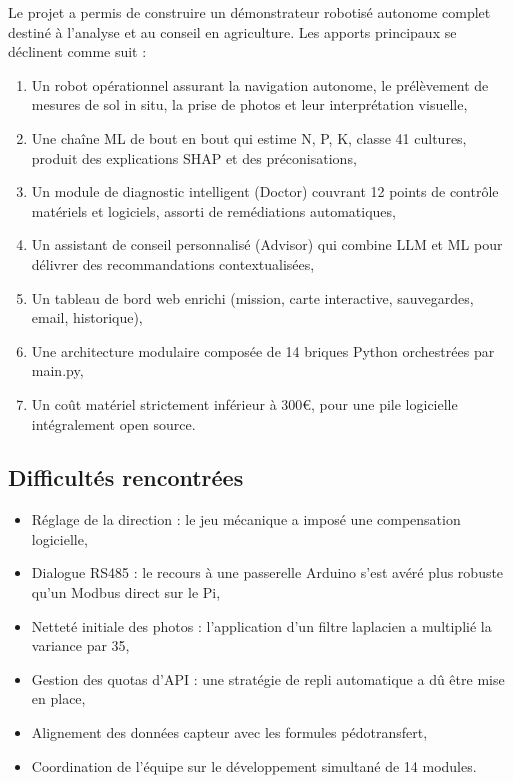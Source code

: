 \documentclass[a4paper,12pt,openany,titlepage]{scrartcl}
\begin{document}
Le projet a permis de construire un démonstrateur robotisé autonome complet destiné à l’analyse et au conseil en agriculture. Les apports principaux se déclinent comme suit :

\begin{enumerate}[nosep]
    \item Un robot opérationnel assurant la navigation autonome, le prélèvement de mesures de sol in situ, la prise de photos et leur interprétation visuelle,
    \item Une chaîne ML de bout en bout qui estime N, P, K, classe 41 cultures, produit des explications SHAP et des préconisations,
    \item Un module de diagnostic intelligent (Doctor) couvrant 12 points de contrôle matériels et logiciels, assorti de remédiations automatiques,
    \item Un assistant de conseil personnalisé (Advisor) qui combine LLM et ML pour délivrer des recommandations contextualisées,
    \item Un tableau de bord web enrichi (mission, carte interactive, sauvegardes, email, historique),
    \item Une architecture modulaire composée de 14 briques Python orchestrées par main.py,
    \item Un coût matériel strictement inférieur à 300\euro, pour une pile logicielle intégralement open source.
\end{enumerate}

\subsection{Difficultés rencontrées}
\begin{itemize}[nosep]
    \item Réglage de la direction : le jeu mécanique a imposé une compensation logicielle,
    \item Dialogue RS485 : le recours à une passerelle Arduino s’est avéré plus robuste qu’un Modbus direct sur le Pi,
    \item Netteté initiale des photos : l’application d’un filtre laplacien a multiplié la variance par 35,
    \item Gestion des quotas d’API : une stratégie de repli automatique a dû être mise en place,
    \item Alignement des données capteur avec les formules pédotransfert,
    \item Coordination de l’équipe sur le développement simultané de 14 modules.
\end{itemize}
\end{document}
